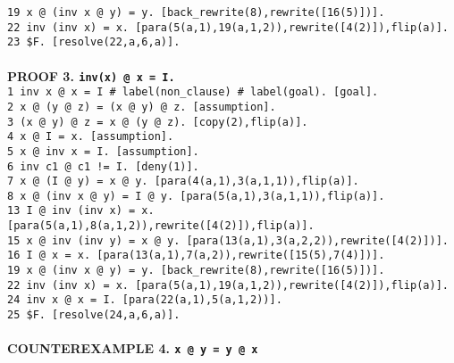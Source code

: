 \documentclass[a4paper]{article}
\begin{document}
	{\tt 19 x @ (inv x @ y) = y.  [back\_rewrite(8),rewrite([16(5)])].}\\
	{\tt 22 inv (inv x) = x.  [para(5(a,1),19(a,1,2)),rewrite([4(2)]),flip(a)].}\\
	{\tt 23 \$F.  [resolve(22,a,6,a)].}\\
	\\
	\textbf{PROOF 3. {\tt  inv(x) @ x = I.}}\\      
	{\tt 1 inv x @ x = I \# label(non\_clause) \# label(goal).  [goal].}\\
	{\tt 2 x @ (y @ z) = (x @ y) @ z.  [assumption].}\\
	{\tt 3 (x @ y) @ z = x @ (y @ z).  [copy(2),flip(a)].}\\
	{\tt 4 x @ I = x.  [assumption].}\\
	{\tt 5 x @ inv x = I.  [assumption].}\\
	{\tt 6 inv c1 @ c1 != I.  [deny(1)].}\\
	{\tt 7 x @ (I @ y) = x @ y.  [para(4(a,1),3(a,1,1)),flip(a)].}\\
	{\tt 8 x @ (inv x @ y) = I @ y.  [para(5(a,1),3(a,1,1)),flip(a)].}\\
	{\tt 13 I @ inv (inv x) = x.  [para(5(a,1),8(a,1,2)),rewrite([4(2)]),flip(a)].}\\
	{\tt 15 x @ inv (inv y) = x @ y.  [para(13(a,1),3(a,2,2)),rewrite([4(2)])].}\\
	{\tt 16 I @ x = x.  [para(13(a,1),7(a,2)),rewrite([15(5),7(4)])].}\\
	{\tt 19 x @ (inv x @ y) = y.  [back\_rewrite(8),rewrite([16(5)])].}\\
	{\tt 22 inv (inv x) = x.  [para(5(a,1),19(a,1,2)),rewrite([4(2)]),flip(a)].}\\
	{\tt 24 inv x @ x = I.  [para(22(a,1),5(a,1,2))].}\\
	{\tt 25 \$F.  [resolve(24,a,6,a)].}\\
	\\
	\textbf{COUNTEREXAMPLE 4. {\tt  x @ y = y @ x}}\\
\end{document}
